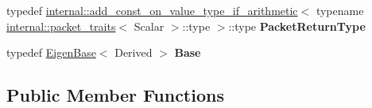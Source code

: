 \begin{DoxyCompactItemize}
typedef \mbox{\hyperlink{struct_eigen_1_1internal_1_1add__const__on__value__type__if__arithmetic}{internal\+::add\+\_\+const\+\_\+on\+\_\+value\+\_\+type\+\_\+if\+\_\+arithmetic}}$<$ typename \mbox{\hyperlink{struct_eigen_1_1internal_1_1packet__traits}{internal\+::packet\+\_\+traits}}$<$ Scalar $>$\+::type $>$\+::type {\bfseries Packet\+Return\+Type}
\item 
\mbox{\label{class_eigen_1_1_dense_coeffs_base_3_01_derived_00_01_read_only_accessors_01_4_ad54041ce176686d856856e04561bb52a}} 
typedef \mbox{\hyperlink{struct_eigen_1_1_eigen_base}{Eigen\+Base}}$<$ Derived $>$ {\bfseries Base}
\end{DoxyCompactItemize}
\subsection*{Public Member Functions}
